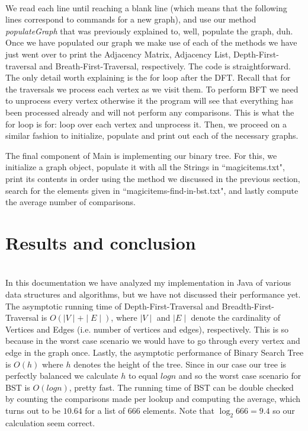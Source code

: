 \documentclass[letterpaper, 10pt]{article}
\begin{document}
\\
We read each line until reaching a blank line (which means that the following lines correspond to commands for a new graph), and use our method \textit{populateGraph} that was previously explained to, well, populate the graph, duh. Once we have populated our graph we make use of each of the methods we have just went over to print the Adjacency Matrix, Adjacency List, Depth-First-traversal and Breath-First-Traversal, respectively. The code is straightforward. The only detail worth explaining is the for loop after the DFT. Recall that for the traversals we process each vertex as we visit them. To perform BFT we need to unprocess every vertex otherwise it the program will see that everything has been processed already and will not perform any comparisons. This is what the for loop is for: loop over each vertex and unprocess it. Then, we proceed on a similar fashion to initialize, populate and print out each of the necessary graphs.

The final component of Main is implementing our binary tree. For this, we initialize a graph object, populate it with all the Strings in ``magicitems.txt", print its contents in order using the method we discussed in the previous section, search for the elements given in ``magicitems-find-in-bst.txt", and lastly compute the average number of comparisons.
\\
\section{Results and conclusion}
\\
In this documentation we have analyzed my implementation in Java of various data structures and algorithms, but we have not discussed their performance yet. The asymptotic running time of Depth-First-Traversal and Breadth-First-Traversal is $O( \mid V \mid + \mid E \mid )$, where $\mid V \mid$ and $\mid E \mid$ denote the cardinality of Vertices and Edges (i.e. number of vertices and edges), respectively. This is so because in the worst case scenario we would have to go through every vertex and edge in the graph once. Lastly, the asymptotic performance of Binary Search Tree is $O(h)$ where $h$ denotes the height of the tree. Since in our case our tree is perfectly balanced we calculate $h$ to equal $log n$ and so the worst case scenario for BST is $O(log n)$, pretty fast. The running time of BST can be double checked by counting the comparisons made per lookup and computing the average, which turns out to be $10.64$ for a list of 666 elements. Note that $\log_2 666 = 9.4$ so our calculation seem correct.
\\
\end{document}
